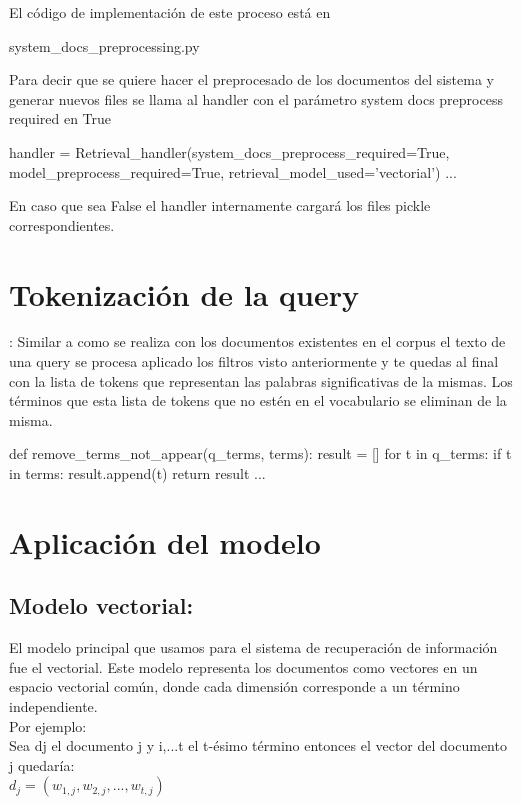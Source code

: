 \documentclass{llncs}
\begin{document}
El código de implementación de este proceso está en 
\begin{python}
    system_docs_preprocessing.py
\end{python}

Para decir que se quiere hacer el preprocesado de los documentos del sistema y generar nuevos files 
se llama al handler con el parámetro system docs preprocess required en True
\begin{python}
handler =  Retrieval_handler(system_docs_preprocess_required=True,
     model_preprocess_required=True, retrieval_model_used='vectorial')
    ...
\end{python}

En caso que sea False el handler internamente cargará los files pickle correspondientes.

\section{Tokenización de la query}:
Similar a como se realiza con los documentos existentes en el corpus el texto de una query
se procesa aplicado los filtros visto anteriormente y te quedas al final con la lista 
de tokens que representan las palabras significativas de la mismas.  Los términos 
que esta lista de tokens que no estén en el vocabulario se eliminan de la misma.

\begin{python}
def remove_terms_not_appear(q_terms, terms):
    result = []
    for t in q_terms:
        if t in terms:
            result.append(t)
    return result
...
\end{python}

\section{Aplicación del modelo}
\subsection{Modelo vectorial:}
El modelo principal que usamos para el sistema de recuperación de información fue el vectorial.
Este modelo representa los documentos como vectores en un espacio vectorial común, donde cada 
dimensión corresponde a un término independiente. \\
Por ejemplo: \\
Sea dj el documento j y i,...t el t-ésimo término entonces el vector del documento j quedaría:\\
$
    d_j = (w_{1,j}, w_{2,j}, ..., w_{t,j})
$
\end{document}
